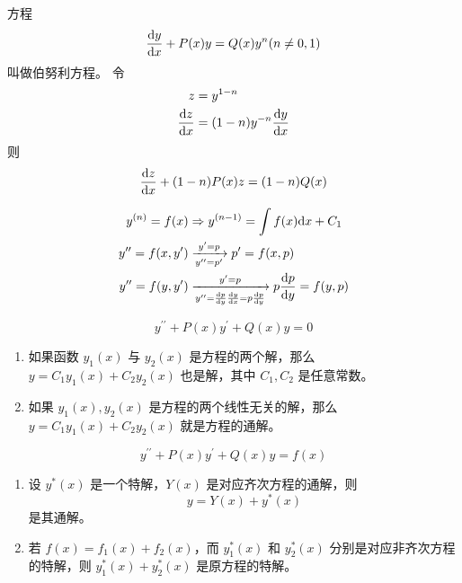 \documentclass{ctexbook}
\def\diff{\textnormal{d}}
\begin{document}
\begin{definition}[伯努利方程]
    方程
    \begin{equation}
        \frac{\diff y}{\diff x}+P(x)y=Q(x)y^n (n\neq 0,1)
    \end{equation}
    叫做伯努利方程。
    令
    \begin{align}
        z&=y^{1-n}\\
        \frac{\diff z}{\diff x}&=(1-n)y^{-n}\frac{\diff y}{\diff x}
    \end{align}
    则
    \begin{equation}
        \frac{\diff z}{\diff x}+(1-n)P(x)z=(1-n)Q(x)
    \end{equation}
\end{definition}

\begin{definition}[可降阶的高阶微分方程]
    \begin{align}
        y^{(n)}=f(x) &\Rightarrow y^{(n-1)}=\int f(x)\diff x+C_1\\
        y^{\prime\prime}=f(x,y^\prime) & \xrightarrow[y^{\prime\prime}=p^\prime]{y^\prime = p} p^\prime = f(x,p)\\
        y^{\prime\prime}=f(y,y^\prime)&\xrightarrow[y^{\prime\prime}=\frac{\diff p}{\diff y}\frac{\diff y}{\diff x}=p\frac{\diff p}{\diff y}]{y^\prime=p} p\frac{\diff p}{\diff y}=f(y,p)
    \end{align}
\end{definition}

\begin{definition}[二阶齐次线性方程]
    \begin{equation}
        y^{\prime\prime}+P(x)y^\prime+Q(x)y=0
    \end{equation}
    \begin{enumerate}
        \item 如果函数 $y_1(x)$ 与 $y_2(x)$ 是方程的两个解，那么 $y=C_1y_1(x)+C_2y_2(x)$ 也是解，其中 $C_1,C_2$ 是任意常数。
        \item 如果 $y_1(x), y_2(x)$ 是方程的两个线性无关的解，那么 $y=C_1y_1(x)+C_2y_2(x)$ 就是方程的通解。
    \end{enumerate}
\end{definition}

\begin{definition}[二阶非齐次线性方程]
    \begin{equation}
        y^{\prime\prime}+P(x)y^\prime+Q(x)y=f(x)
    \end{equation}
    \begin{enumerate}
        \item 设 $y^*(x)$ 是一个特解，$Y(x)$ 是对应齐次方程的通解，则
        \begin{equation}
            y=Y(x)+y^*(x)
        \end{equation}
        是其通解。
        \item 若 $f(x)=f_1(x)+f_2(x)$，而 $y_1^*(x)$ 和 $y_2^*(x)$ 分别是对应非齐次方程的特解，则 $y_1^*(x)+y_2^*(x)$ 是原方程的特解。
    \end{enumerate}
\end{definition}
\end{document}
